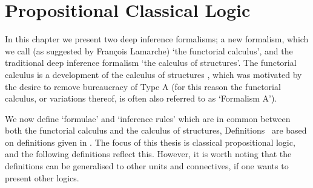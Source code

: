 \chapter{Propositional Classical Logic}\label{chapter:PropositionalClassicalLogic}

In this chapter we present two deep inference formalisms; a new formalism, which we call (as suggested by Fran\c{c}ois Lamarche) `the functorial calculus', and the traditional deep inference formalism `the calculus of structures'. The functorial calculus is a development of the calculus of structures \cite{}, which was motivated by the desire to remove bureaucracy of Type A \cite{} (for this reason the functorial calculus, or variations thereof, is often also referred to as `Formalism A').


We now define `formulae' and `inference rules' which are in common between both the functorial calculus and the calculus of structures, Definitions~ are based on definitions given in \cite{}. The focus of this thesis is classical propositional logic, and the following definitions reflect this. However, it is worth noting that the definitions can be generalised to other units and connectives, if one wants to present other logics.

